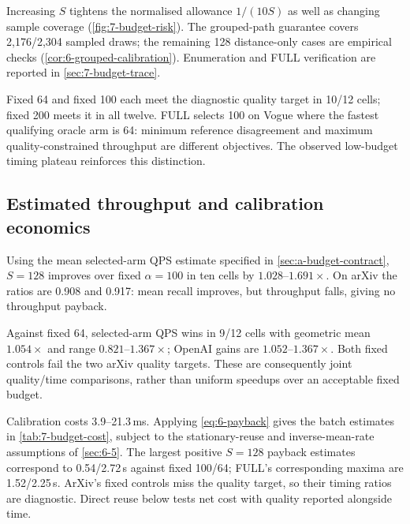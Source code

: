 Increasing $S$ tightens the normalised allowance $1/(10S)$ as well
as changing sample coverage (\cref{fig:7-budget-risk}).
The grouped-path guarantee covers 2,176/2,304 sampled draws;
the remaining 128 distance-only cases are empirical checks
(\cref{cor:6-grouped-calibration}). Enumeration and FULL verification
are reported in \cref{sec:7-budget-trace}.

Fixed 64 and fixed 100 each meet the diagnostic quality target in 10/12
cells; fixed 200 meets it in all twelve. FULL selects 100 on Vogue
where the fastest qualifying oracle arm is 64: minimum reference
disagreement and maximum quality-constrained throughput are different
objectives. The observed low-budget timing plateau reinforces this
distinction.

\subsection{Estimated throughput and calibration economics}

Using the mean selected-arm QPS estimate specified in
\cref{sec:a-budget-contract}, $S=128$ improves over fixed $\alpha=100$
in ten cells by $1.028$--$1.691\times$. On arXiv the ratios are 0.908
and 0.917: mean recall improves, but throughput falls, giving no
throughput payback.


Against fixed 64, selected-arm QPS wins in 9/12 cells with geometric
mean $1.054\times$ and range $0.821$--$1.367\times$; OpenAI gains are
$1.052$--$1.367\times$. Both fixed controls fail the two arXiv quality
targets. These are consequently joint quality/time comparisons, rather
than uniform speedups over an acceptable fixed budget.

\begin{table}[tbp]
\centering
\caption[Sampled-calibration economics]{Calibration economics, $S=128$. Rates are kQPS and rule rate is
mean selected-arm QPS. Ratios compare with fixed 100 and fixed 64.
The ``Batches'' column gives payback relative to fixed 100 using 500
queries, or 499 for Stella; ``Never'' denotes no throughput payback.
The quality column separately marks whether fixed 100 meets the
held-out loss target.}
\label{tab:7-budget-cost}
\footnotesize\setlength{\tabcolsep}{3pt}

\end{table}

Calibration costs 3.9--21.3\,ms. Applying \cref{eq:6-payback} gives
the batch estimates in \cref{tab:7-budget-cost}, subject to the
stationary-reuse and inverse-mean-rate assumptions of \cref{sec:6-5}.
The largest positive $S=128$ payback estimates correspond to
0.54/2.72\,s against fixed 100/64; FULL's corresponding maxima are
1.52/2.25\,s. ArXiv's fixed controls miss the quality target, so their
timing ratios are diagnostic. Direct reuse below tests net cost with
quality reported alongside time.

